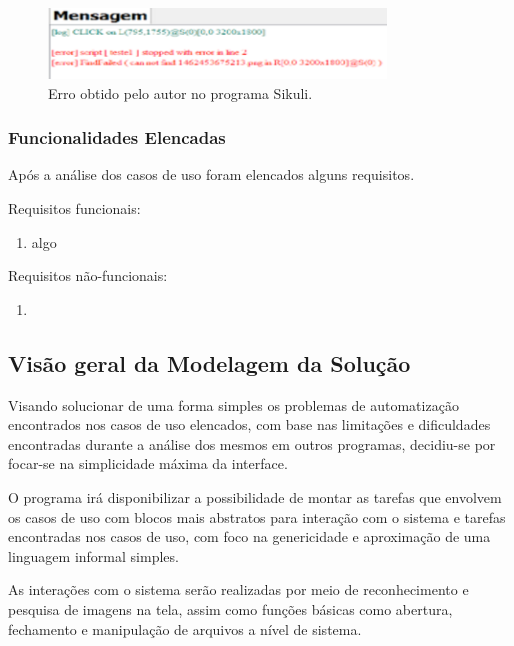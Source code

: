 \documentclass[12pt]{article}
\begin{document}
	\begin{figure}[!htb]
		{\centering
		\includegraphics[width=0.8\textwidth]{sikuli_error}
		\caption{Erro obtido pelo autor no programa Sikuli.}
		\label{fig:erroSikuli}}
	\end{figure}	
	
	\subsubsection {Funcionalidades Elencadas}

	Após a análise dos casos de uso foram elencados alguns requisitos.
	
	Requisitos funcionais:
	
	\begin{enumerate}
		\item algo
	\end{enumerate}
	
	Requisitos não-funcionais:
	
	\begin{enumerate}
		\item
	\end{enumerate}
	
	 
	\subsection {Visão geral da Modelagem da Solução}
	
		Visando solucionar de uma forma simples os problemas de automatização encontrados nos casos de uso elencados, com base nas limitações e dificuldades encontradas durante a análise dos mesmos em outros programas, decidiu-se por focar-se na simplicidade máxima da interface.

		O programa irá disponibilizar a possibilidade de montar as tarefas que envolvem os casos de uso com blocos mais abstratos para interação com o sistema e tarefas encontradas nos casos de uso, com foco na genericidade e aproximação de uma linguagem informal simples.

		As interações com o sistema serão realizadas por meio de reconhecimento e pesquisa de imagens na tela, assim como funções básicas como abertura, fechamento e manipulação de arquivos a nível de sistema.
		
\end{document}
